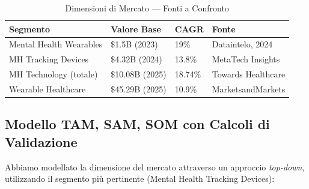 \documentclass[12pt,a4paper]{article}
\begin{document}
\begin{table}[h!]
    \centering
    \small
    \caption{Dimensioni di Mercato --- Fonti a Confronto}
    \vspace{0.3cm}
    \begin{tabularx}{\textwidth}{@{}X l l l@{}}
        \toprule
        \textbf{Segmento} & \textbf{Valore Base} & \textbf{CAGR} & \textbf{Fonte} \\ \midrule
        Mental Health Wearables & \$1.5B (2023) & 19\% & Dataintelo, 2024 \\
        MH Tracking Devices & \$4.32B (2024) & 13.8\% & MetaTech Insights \\
        MH Technology (totale) & \$10.08B (2025) & 18.74\% & Towards Healthcare \\
        Wearable Healthcare & \$45.29B (2025) & 10.9\% & MarketsandMarkets \\
        \bottomrule
    \end{tabularx}
\end{table}

\subsection{Modello TAM, SAM, SOM con Calcoli di Validazione}
Abbiamo modellato la dimensione del mercato attraverso un approccio \textit{top-down}, utilizzando il segmento più pertinente (Mental Health Tracking Devices):
\end{document}
